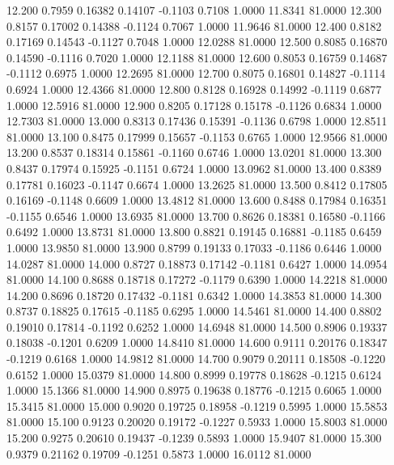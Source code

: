   12.200   0.7959   0.16382   0.14107  -0.1103   0.7108   1.0000  11.8341  81.0000
  12.300   0.8157   0.17002   0.14388  -0.1124   0.7067   1.0000  11.9646  81.0000
  12.400   0.8182   0.17169   0.14543  -0.1127   0.7048   1.0000  12.0288  81.0000
  12.500   0.8085   0.16870   0.14590  -0.1116   0.7020   1.0000  12.1188  81.0000
  12.600   0.8053   0.16759   0.14687  -0.1112   0.6975   1.0000  12.2695  81.0000
  12.700   0.8075   0.16801   0.14827  -0.1114   0.6924   1.0000  12.4366  81.0000
  12.800   0.8128   0.16928   0.14992  -0.1119   0.6877   1.0000  12.5916  81.0000
  12.900   0.8205   0.17128   0.15178  -0.1126   0.6834   1.0000  12.7303  81.0000
  13.000   0.8313   0.17436   0.15391  -0.1136   0.6798   1.0000  12.8511  81.0000
  13.100   0.8475   0.17999   0.15657  -0.1153   0.6765   1.0000  12.9566  81.0000
  13.200   0.8537   0.18314   0.15861  -0.1160   0.6746   1.0000  13.0201  81.0000
  13.300   0.8437   0.17974   0.15925  -0.1151   0.6724   1.0000  13.0962  81.0000
  13.400   0.8389   0.17781   0.16023  -0.1147   0.6674   1.0000  13.2625  81.0000
  13.500   0.8412   0.17805   0.16169  -0.1148   0.6609   1.0000  13.4812  81.0000
  13.600   0.8488   0.17984   0.16351  -0.1155   0.6546   1.0000  13.6935  81.0000
  13.700   0.8626   0.18381   0.16580  -0.1166   0.6492   1.0000  13.8731  81.0000
  13.800   0.8821   0.19145   0.16881  -0.1185   0.6459   1.0000  13.9850  81.0000
  13.900   0.8799   0.19133   0.17033  -0.1186   0.6446   1.0000  14.0287  81.0000
  14.000   0.8727   0.18873   0.17142  -0.1181   0.6427   1.0000  14.0954  81.0000
  14.100   0.8688   0.18718   0.17272  -0.1179   0.6390   1.0000  14.2218  81.0000
  14.200   0.8696   0.18720   0.17432  -0.1181   0.6342   1.0000  14.3853  81.0000
  14.300   0.8737   0.18825   0.17615  -0.1185   0.6295   1.0000  14.5461  81.0000
  14.400   0.8802   0.19010   0.17814  -0.1192   0.6252   1.0000  14.6948  81.0000
  14.500   0.8906   0.19337   0.18038  -0.1201   0.6209   1.0000  14.8410  81.0000
  14.600   0.9111   0.20176   0.18347  -0.1219   0.6168   1.0000  14.9812  81.0000
  14.700   0.9079   0.20111   0.18508  -0.1220   0.6152   1.0000  15.0379  81.0000
  14.800   0.8999   0.19778   0.18628  -0.1215   0.6124   1.0000  15.1366  81.0000
  14.900   0.8975   0.19638   0.18776  -0.1215   0.6065   1.0000  15.3415  81.0000
  15.000   0.9020   0.19725   0.18958  -0.1219   0.5995   1.0000  15.5853  81.0000
  15.100   0.9123   0.20020   0.19172  -0.1227   0.5933   1.0000  15.8003  81.0000
  15.200   0.9275   0.20610   0.19437  -0.1239   0.5893   1.0000  15.9407  81.0000
  15.300   0.9379   0.21162   0.19709  -0.1251   0.5873   1.0000  16.0112  81.0000
